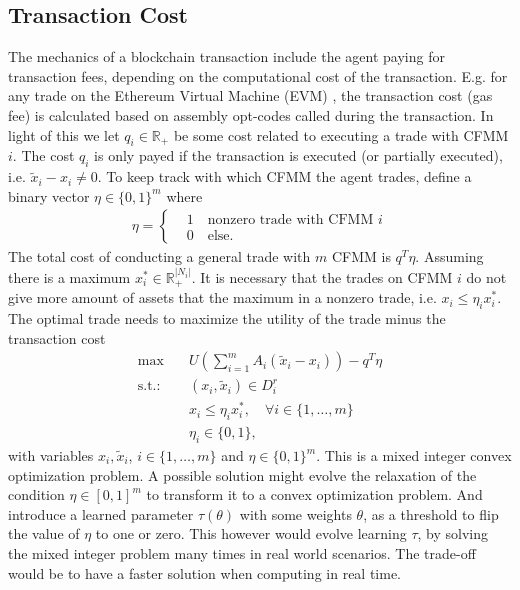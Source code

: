 \subsection{Transaction Cost}
The mechanics of a blockchain transaction include the agent paying for
transaction fees, depending on the computational cost of the transaction.
E.g. for any trade on the Ethereum Virtual Machine (EVM) \cite{evm_optcodes},
the transaction cost (gas fee) is calculated based on assembly opt-codes
called during the transaction. In light of this we let $q_i \in \mathbb{R}_+$
be some cost related to executing a trade with CFMM $i$. The cost $q_i$ is only
payed if the transaction is executed (or partially executed), i.e. $\tilde{x}_i -
x_i \neq 0$. To keep track with which CFMM the agent trades, define a binary
vector $\eta \in \{0, 1\}^{m} $ where
\begin{align}
    \eta =
    \begin{cases}
        &1\quad \text{nonzero trade with CFMM $i$} \\
        &0\quad \text{else}.
    \end{cases}
\end{align}
The total cost of conducting a general trade with $m$ CFMM is $q^{T}\eta$.
Assuming there is a maximum $x_i^{*} \in \mathbb{R}_+^{|N_i|}$. It is
necessary that the trades on CFMM $i$ do not give more amount of assets that
the maximum in a nonzero trade, i.e. $x_i \le \eta_ix_i^{*}$. The optimal
trade needs to maximize the utility of the trade minus the transaction cost
\begin{align}
    \text{max} \quad &U\left(\sum_{i=1}^{m} A_i(\tilde{x}_i-x_i)\right) - q^{T}\eta  \label{eq: trade_transaction_cost}\\
    \text{s.t.:}\quad & (x_i, \tilde{x}_i) \in D_i^{r}\\
          &x_i \le \eta_i x_i^{*}, \quad \forall i \in\{1,\ldots,m\} \\
          &\eta_i \in \{0, 1\},
\end{align}
with variables $x_i, \tilde{x}_i$, $i\in\{1,\ldots,m\}$ and $\eta \in
\{0,1\}^{m} $. This is a mixed integer convex optimization
problem. A possible solution might evolve the relaxation of the condition
$\eta \in [0, 1]^{m}$ to transform it to a convex optimization problem. And
introduce a learned parameter $\tau(\theta)$ with some weights $\theta$, as a
threshold to flip the value of $\eta$ to one or zero. This however would
evolve learning $\tau$, by solving the mixed integer problem many times in
real world scenarios. The trade-off would be to have a faster solution when
computing in real time.
